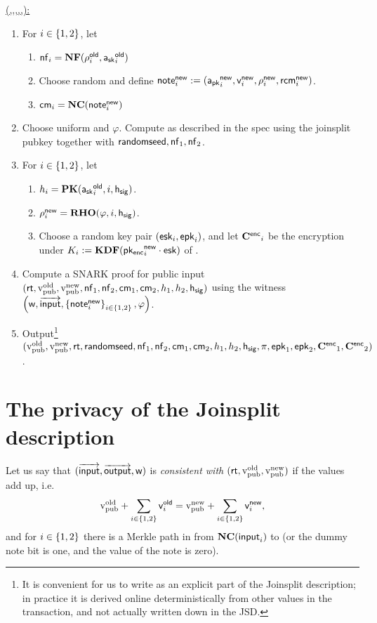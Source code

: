 \documentclass[11pt]{article}
\numberwithin{equation}{section} %
\numberwithin{figure}{section} %
\begin{document}
\underline{\makejsd(\rt,\vold,\vnew,,\outputs,\wit):}
\begin{enumerate}
\item For $i\in \left\{1,2\right\}$, let 

\begin{enumerate}
 \item $\mathsf{nf}_i=\mathbf{NF}(\rho_i^{\mathsf{old}}, \mathsf{a_{sk}}_i^{\mathsf{old}})$
 \item Choose random \new{\rcm} and define $\mathsf{note}_i^{\mathsf{new}}:= (\mathsf{a_{pk}}_i^{\mathsf{new}},\mathsf{v}_i^{\mathsf{new}},\rho_i^{\mathsf{new}},\mathsf{rcm}_i^{\mathsf{new}})$.
\item $\mathsf{cm}_i = \mathbf{NC}(\mathsf{note}_i^{\mathsf{new}})$
 \end{enumerate}

 \item Choose uniform \randomseed and $\varphi$. Compute \hsig as described in the spec using the joinsplit pubkey together with $\mathsf{randomseed},\mathsf{nf}_1,\mathsf{nf}_2$.
\item For $i\in \left\{1,2\right\}$, let 
\begin{enumerate}

\item $h_i = \mathbf{PK}(\mathsf{a_{sk}}_i^{\mathsf{old}},i,\mathsf{h_{sig}})$.
\item $\rho_i^{\mathsf{new}}=\mathbf{RHO}(\varphi,i,\mathsf{h_{sig}})$.
\item Choose a random key pair $(\mathsf{esk}_i,\mathsf{epk}_i)$, and let $\mathbf{C^{\mathsf{enc}}}_i$ be the encryption under $K_i:= \mathbf{KDF}(\mathsf{pk_{enc}}_i^{\mathsf{new}}\cdot \mathsf{esk})$ of
\new{\note}.
\end{enumerate}
\item Compute a SNARK proof \prf for public input $(\mathsf{rt},\mathrm{v_{pub}^{old}},\mathrm{v_{pub}^{new}},\mathsf{nf}_1,\mathsf{nf}_2,\mathsf{cm}_1,\mathsf{cm}_2,h_1,h_2,\mathsf{h_{sig}})$ using the witness $\left(\mathsf{w},\overrightarrow{\mathsf{input}},\left\{\mathsf{note}_i^{\mathsf{new}}\right\}_{i\in\left\{1,2\right\}}, \varphi\right )$.
\item Output\footnote{It is convenient for us to write \hsig as an explicit part of the Joinsplit description; in practice it is derived online deterministically from other values in the transaction, and not actually written down in the JSD.} $(\mathrm{v_{pub}^{old}},\mathrm{v_{pub}^{new}},\mathsf{rt},\mathsf{randomseed},\mathsf{nf}_1,\mathsf{nf}_2,\mathsf{cm}_1,\mathsf{cm}_2,h_1,h_2,\mathsf{h_{sig}},\pi,\mathsf{epk}_1,\mathsf{epk}_2,\mathbf{C^{\mathsf{enc}}}_1,\mathbf{C^{\mathsf{enc}}}_2)$.

\end{enumerate}


\section{The privacy of the Joinsplit description}


Let us say that $(\overrightarrow{\mathsf{input}},\overrightarrow{\mathsf{output}},\mathsf{w})$ is \emph{consistent with $(\mathsf{rt},\mathrm{v_{pub}^{old}},\mathrm{v_{pub}^{new}})$}
if the values add up, i.e.
\[\mathrm{v_{pub}^{old}}+\sum_{i\in \left\{1,2\right\}}\mathsf{v}_i^{\mathsf{old}} = \mathrm{v_{pub}^{new}} + \sum_{i\in \left\{1,2\right\}} \mathsf{v}_i^{\mathsf{new}},\]
and for $i\in \left\{1,2\right\}$ there is a Merkle path in \wit from $\mathbf{NC}(\mathsf{input}_i)$ to \rt (or the dummy note bit is one, and the value of the note is zero).
\end{document}
